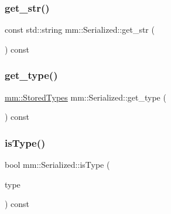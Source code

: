 \mbox{\label{structmm_1_1_serialized_aa3eb7eb50d6b343993c08a4d369af8b2}} 
\subsubsection{\texorpdfstring{get\+\_\+str()}{get\_str()}}
{\footnotesize\ttfamily const std\+::string mm\+::\+Serialized\+::get\+\_\+str (\begin{DoxyParamCaption}{ }\end{DoxyParamCaption}) const\hspace{0.3cm}{\ttfamily [noexcept]}}

\mbox{\label{structmm_1_1_serialized_a9a257b31c4426077a3bd460d1e6cbd89}} 
\subsubsection{\texorpdfstring{get\+\_\+type()}{get\_type()}}
{\footnotesize\ttfamily \mbox{\hyperlink{namespacemm_ad5a796af6d7145f51e84a73ed35a601c}{mm\+::\+Stored\+Types}} mm\+::\+Serialized\+::get\+\_\+type (\begin{DoxyParamCaption}{ }\end{DoxyParamCaption}) const\hspace{0.3cm}{\ttfamily [noexcept]}}

\mbox{\label{structmm_1_1_serialized_ac0e23433a34f0d326042907895a03353}} 
\subsubsection{\texorpdfstring{is\+Type()}{isType()}}
{\footnotesize\ttfamily bool mm\+::\+Serialized\+::is\+Type (\begin{DoxyParamCaption}\item[{\mbox{\hyperlink{namespacemm_ad5a796af6d7145f51e84a73ed35a601c}{mm\+::\+Stored\+Types}}}]{type }\end{DoxyParamCaption}) const\hspace{0.3cm}{\ttfamily [noexcept]}}


